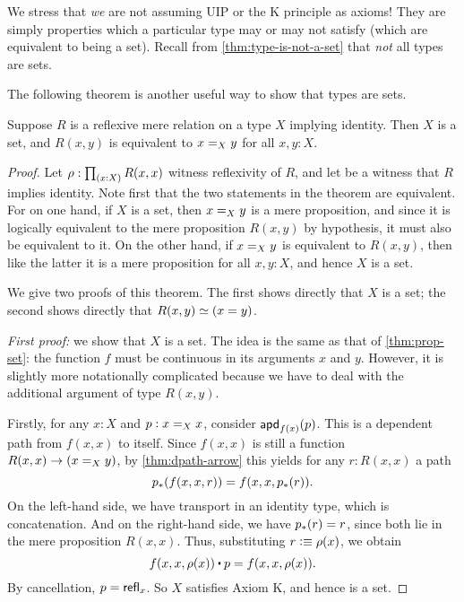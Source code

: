 We stress that \emph{we} are not assuming UIP or the K principle as axioms!
They are simply properties which a particular type may or may not satisfy (which are equivalent to being a set).
Recall from \autoref{thm:type-is-not-a-set} that \emph{not} all types are sets.

The following theorem is another useful way to show that types are sets.

\begin{thm}\label{thm:h-set-refrel-in-paths-sets}
  Suppose $R$ is a reflexive mere relation on a type $X$ implying identity.
  Then $X$ is a set, and $R(x,y)$ is equivalent to $\id[X]{x}{y}$ for all $x,y:X$.
\end{thm}

\begin{proof}
  Let $\rho : \prd{x:X} R(x,x)$ witness reflexivity of $R$, and let  be a witness that $R$
implies identity.
  Note first that the two statements in the theorem are equivalent.
  For on one hand, if $X$ is a set, then $\id[X]xy$ is a mere proposition, and since it is logically equivalent to the mere proposition
$R(x,y)$ by hypothesis, it must also be equivalent to it.
  On the other hand, if $\id[X]xy$ is equivalent to $R(x,y)$, then like the latter it is a mere proposition for all $x,y:X$, and hence $X$
is a set.

  We give two proofs of this theorem.
  The first shows directly that $X$ is a set; the second shows directly that $R(x,y)\eqvsym (x=y)$.

  \emph{First proof:} we show that $X$ is a set.
  The idea is the same as that of \autoref{thm:prop-set}: the function $f$ must be continuous in its arguments $x$ and $y$.
  However, it is slightly more notationally complicated because we have to deal with the additional argument of type $R(x,y)$.

  Firstly, for any $x:X$ and $p:\id[X]xx$, consider $\apdfunc{f(x)}(p)$.
  This is a dependent path from $f(x,x)$ to itself.
  Since $f(x,x)$ is still a function $R(x,x) \to (\id[X]xy)$, by \autoref{thm:dpath-arrow} this yields for any $r:R(x,x)$ a path
  \[\trans{p}{f(x,x,r)} = f(x,x,\trans{p}r).
  \]
  On the left-hand side, we have transport in an identity type, which is concatenation.
  And on the right-hand side, we have $\trans{p}r = r$, since both lie in the mere proposition $R(x,x)$.
  Thus, substituting $r\defeq \rho(x)$, we obtain
  \[ f(x,x,\rho(x)) \ct p = f(x,x,\rho(x)). \]
  By cancellation, $p=\refl{x}$.
  So $X$ satisfies Axiom K, and hence is a set.


\end{proof}
